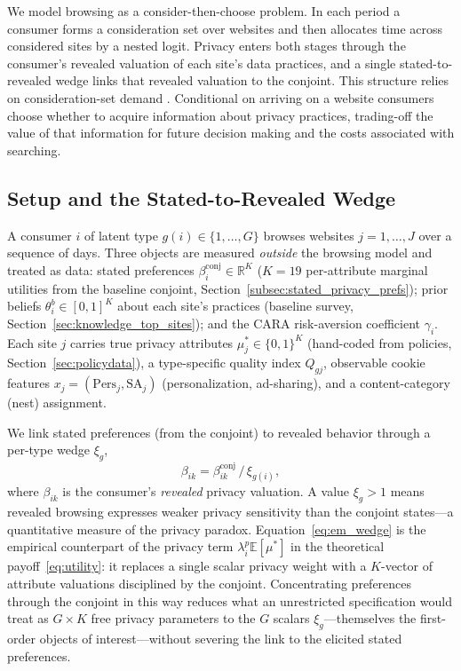 \documentclass[12pt]{article}
\theoremstyle{definition}
\theoremstyle{remark}
\begin{document}
We model browsing as a consider-then-choose problem. In each period a consumer forms a consideration set over websites and then allocates time across considered sites by a nested logit. Privacy enters both stages through the consumer's revealed valuation of each site's data practices, and a single stated-to-revealed wedge links that revealed valuation to the conjoint. This structure relies on consideration-set demand \citep{goeree2008limited}. Conditional on arriving on a website consumers choose whether to acquire information about privacy practices, trading-off the value of that information for future decision making and the costs associated with searching.

\subsection{Setup and the Stated-to-Revealed Wedge}

A consumer $i$ of latent type $g(i) \in \{1, \dots, G\}$ browses websites $j = 1, \dots, J$ over a sequence of days. Three objects are measured \emph{outside} the browsing model and treated as data: stated preferences $\beta^{\text{conj}}_i \in \mathbb{R}^{K}$ ($K = 19$ per-attribute marginal utilities from the baseline conjoint, Section~\ref{subsec:stated_privacy_prefs}); prior beliefs $\theta^b_i \in [0,1]^{K}$ about each site's practices (baseline survey, Section~\ref{sec:knowledge_top_sites}); and the CARA risk-aversion coefficient $\gamma_i$. Each site $j$ carries true privacy attributes $\mu^*_j \in \{0,1\}^{K}$ (hand-coded from policies, Section~\ref{sec:policydata}), a type-specific quality index $Q_{gj}$, observable cookie features $x_j = (\text{Pers}_j, \text{SA}_j)$ (personalization, ad-sharing), and a content-category (nest) assignment.

We link stated preferences (from the conjoint) to revealed behavior through a per-type wedge $\xi_g$,
\begin{equation}\label{eq:em_wedge}
  \beta_{ik} = \beta^{\text{conj}}_{ik} \, / \, \xi_{g(i)},
\end{equation}
where $\beta_{ik}$ is the consumer's \emph{revealed} privacy valuation. A value $\xi_g > 1$ means revealed browsing expresses weaker privacy sensitivity than the conjoint states---a quantitative measure of the privacy paradox. Equation~\eqref{eq:em_wedge} is the empirical counterpart of the privacy term $\lambda^p_i \mathbb{E}[\mu^*]$ in the theoretical payoff~\eqref{eq:utility}: it replaces a single scalar privacy weight with a $K$-vector of attribute valuations disciplined by the conjoint. Concentrating preferences through the conjoint in this way reduces what an unrestricted specification would treat as $G \times K$ free privacy parameters to the $G$ scalars $\xi_g$---themselves the first-order objects of interest---without severing the link to the elicited stated preferences.
\end{document}
